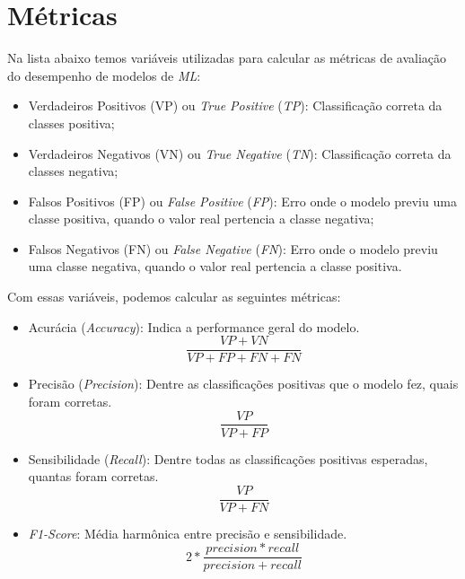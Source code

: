 \section{Métricas}\label{sec:metricas}

Na lista abaixo temos variáveis utilizadas para calcular as métricas de avaliação do desempenho de modelos de \textit{ML}:

\begin{itemize}
    \item Verdadeiros Positivos (VP) ou \textit{True Positive} (\textit{TP}): Classificação correta da classes positiva;
    \item Verdadeiros Negativos (VN) ou \textit{True Negative} (\textit{TN}): Classificação correta da classes negativa;
    \item Falsos Positivos (FP) ou \textit{False Positive} (\textit{FP}): Erro onde o modelo previu uma classe positiva, quando o valor real pertencia a classe negativa;
    \item Falsos Negativos (FN) ou \textit{False Negative} (\textit{FN}): Erro onde o modelo previu uma classe negativa, quando
o valor real pertencia a classe positiva.
\end{itemize}

Com essas variáveis, podemos calcular as seguintes métricas:

\begin{itemize}
    \item Acurácia (\textit{Accuracy}): Indica a performance geral do modelo.
        \begin{equation}
        \frac{VP + VN}{VP+FP+FN+FN}
        \end{equation}
    \item Precisão (\textit{Precision}): Dentre as classificações positivas que o modelo fez, quais foram corretas.
        \begin{equation}
        \frac{VP}{VP+FP}
        \end{equation}
    \item Sensibilidade (\textit{Recall}): Dentre todas as classificações positivas esperadas, quantas foram corretas.
        \begin{equation}
        \frac{VP}{VP+FN}
        \end{equation}
    \item \textit{F1-Score}: Média harmônica entre precisão e sensibilidade.
        \begin{equation}
        2 * \frac{precision  * recall}{precision + recall}
        \end{equation}
\end{itemize}

